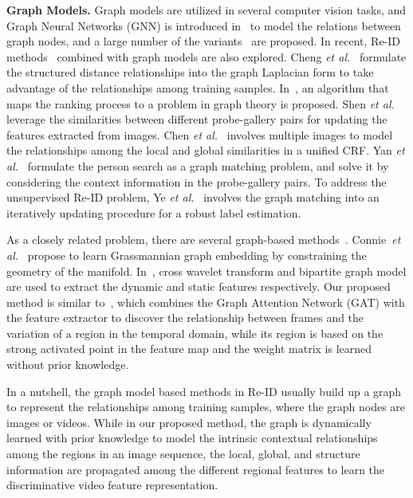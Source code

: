 \documentclass[journal]{IEEEtran}
\newcommand{\etal}{\textit{et al.}}
\begin{document}
\textbf{Graph Models.}
Graph models are utilized in several computer vision tasks, and Graph Neural Networks (GNN) is introduced in~\cite{Scarselli_2009_TNN} to model the relations between graph nodes, and a large number of the variants~\cite{Hamilton_2017_NIPS,Kipf_2017_ICLR,Velickovic_2018_ICLR,Ying_2018_NIPS,Zhang_2018_AAAI,Yan_2018_AAAI} are proposed. In recent, Re-ID methods~\cite{Cheng_2018_PR,Barman_2017_ICCV,Shen_2018_ECCV,Chen_2018_CVPR_Group,Yan_2019_CVPR} combined with graph models are also explored. Cheng \etal~\cite{Cheng_2018_PR} formulate the structured distance relationships into the graph Laplacian form to take advantage of the relationships among training samples. In~\cite{Barman_2017_ICCV}, an algorithm that maps the ranking process to a problem in graph theory is proposed. Shen \etal~\cite{Shen_2018_ECCV} leverage the similarities between different probe-gallery pairs for updating the features extracted from images. Chen \etal~\cite{Chen_2018_CVPR_Group} involves multiple images to model the relationships among the local and global similarities in a unified CRF. Yan \etal~\cite{Yan_2019_CVPR} formulate the person search as a graph matching problem, and solve it by considering the context information in the probe-gallery pairs. To address the unsupervised Re-ID problem, Ye \etal~\cite{Ye_2017_ICCV} involves the graph matching into an iteratively updating procedure for a robust label estimation.

As a closely related problem, there are several graph-based methods~\cite{More_2018_IJAS,Connie_2014_EURASIP,Wu_2019_ACPR}. Connie~\etal~\cite{Connie_2014_EURASIP} propose to learn Grassmannian graph embedding by constraining the geometry of the manifold. In~\cite{More_2018_IJAS}, cross wavelet transform and bipartite graph model are used to extract the dynamic and static features respectively. Our proposed method is similar to~\cite{Wu_2019_ACPR}, which combines the Graph Attention Network (GAT) with the feature extractor to discover the relationship between frames and the variation of a region in the temporal domain, while its region is based on the strong activated point in the feature map and the weight matrix is learned without prior knowledge.

In a nutshell, the graph model based methods in Re-ID usually build up a graph to represent the relationships among training samples, where the graph nodes are images or videos. While in our proposed method, the graph is dynamically learned with prior knowledge to model the intrinsic contextual relationships among the regions in an image sequence, the local, global, and structure information are propagated among the different regional features to learn the discriminative video feature representation.
\end{document}
